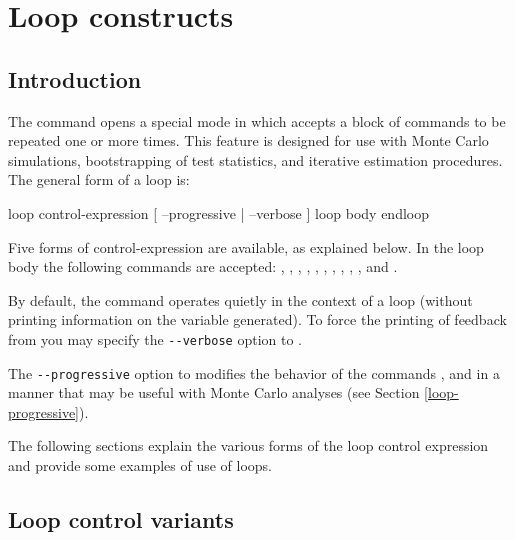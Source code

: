 \chapter{Loop constructs}
\label{looping}

\section{Introduction}
\label{loop-intro}

The command  opens a special mode in which 
accepts a block of commands to be repeated one or more times.  This
feature is designed for use with Monte Carlo simulations,
bootstrapping of test statistics, and iterative estimation procedures.
The general form of a loop is:

\begin{code}
      loop control-expression [ --progressive | --verbose ]
         loop body
      endloop
\end{code}

Five forms of control-expression are available, as explained below.
In the loop body the following commands are accepted: ,
, , , , ,
, , , ,  and
.

By default, the  command operates quietly in the context of
a loop (without printing information on the variable generated).  To
force the printing of feedback from  you may specify the
\verb+--verbose+ option to .

The \verb+--progressive+ option to  modifies the behavior of
the commands ,  and  in a manner that
may be useful with Monte Carlo analyses (see Section
\ref{loop-progressive}).
    
The following sections explain the various forms of the loop control
expression and provide some examples of use of loops.  


\section{Loop control variants}
\label{loop-control}


